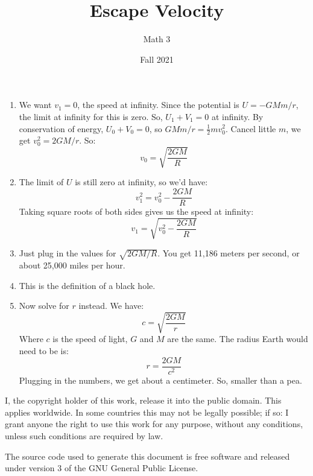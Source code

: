 \documentclass{article}
\title{Escape Velocity}
\author{Math 3}
\date{Fall 2021}
\begin{document}
    \maketitle
    \begin{enumerate}
        \item   We want $v_{1}=0$, the speed at infinity. Since the potential is
                $U=-GMm/r$, the limit at infinity for this is zero. So,
                $U_{1}+V_{1}=0$ at infinity. By conservation of energy,
                $U_{0}+V_{0}=0$, so $GMm/r=\frac{1}{2}mv_{0}^{2}$. Cancel little
                $m$, we get $v_{0}^{2}=2GM/r$. So:
                \begin{equation}
                  v_{0}=\sqrt{\frac{2GM}{R}}
                \end{equation}
        \item   The limit of $U$ is still zero at infinity, so we'd have:
                \begin{equation}
                    v_{1}^{2}=v_{0}^{2}-\frac{2GM}{R}
                \end{equation}
                Taking square roots of both sides gives us the speed at
                infinity:
                \begin{equation}
                    v_{1}=\sqrt{v_{0}^{2}-\frac{2GM}{R}}
                \end{equation}
        \item   Just plug in the values for $\sqrt{2GM/R}$. You get
                11,186 meters per second, or about 25,000 miles per hour.
        \item   This is the definition of a black hole.
        \item   Now solve for $r$ instead. We have:
                \begin{equation}
                    c=\sqrt{\frac{2GM}{r}}
                \end{equation}
                Where $c$ is the speed of light, $G$ and $M$ are the same. The
                radius Earth would need to be is:
                \begin{equation}
                    r=\frac{2GM}{c^{2}}
                \end{equation}
                Plugging in the numbers, we get about a centimeter. So, smaller
                than a pea.
    \end{enumerate}
    \newpage
    I, the copyright holder of this work, release it into the public domain.
    This applies worldwide. In some countries this may not be legally possible;
    if so: I grant anyone the right to use this work for any purpose, without
    any conditions, unless such conditions are required by law.
    \par\hfill\par
    The source code used to generate this document is free software and released
    under version 3 of the GNU General Public License.
\end{document}
